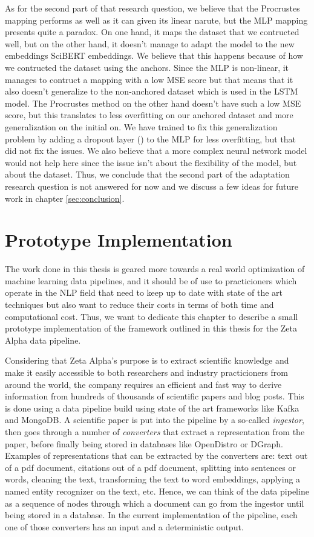 \documentclass[12pt]{extreport}
\begin{document}
As for the second part of that research question, we believe that the Procrustes mapping performs as well as it can given its linear narute, but the MLP mapping presents quite a paradox. On one hand, it maps the dataset that we contructed well, but on the other hand, it doesn't manage to adapt the model to the new embeddings SciBERT embeddings. We believe that this happens because of how we contructed the dataset using the anchors. Since the MLP is non-linear, it manages to contruct a mapping with a low MSE score but that means that it also doesn't generalize to the non-anchored dataset which is used in the LSTM model. The Procrustes method on the other hand doesn't have such a low MSE score, but this translates to less overfitting on our anchored dataset and more generalization on the initial on. We have trained to fix this generalization problem by adding a dropout layer (\cite{dropout}) to the MLP for less overfitting, but that did not fix the issues. We also believe that a more complex neural network model would not help here since the issue isn't about the flexibility of the model, but about the dataset. Thus, we conclude that the second part of the adaptation research question is not answered for now and we discuss a few ideas for future work in chapter \ref{sec:conclusion}.

\chapter{Prototype Implementation} \label{sec:prototype}

The work done in this thesis is geared more towards a real world optimization of machine learning data pipelines, and it should be of use to practicioners which operate in the NLP field that need to keep up to date with state of the art techniques but also want to reduce their costs in terms of both time and computational cost. Thus, we want to dedicate this chapter to describe a small prototype implementation of the framework outlined in this thesis for the Zeta Alpha data pipeline.

Considering that Zeta Alpha's purpose is to extract scientific knowledge and make it easily accessible to both researchers and industry practicioners from around the world, the company requires an efficient and fast way to derive information from hundreds of thousands of scientific papers and blog posts. This is done using a data pipeline build using state of the art frameworks like Kafka and MongoDB. A scientific paper is put into the pipeline by a so-called \emph{ingestor}, then goes through a number of \emph{converters} that extract a representation from the paper, before finally being stored in databases like OpenDistro or DGraph. Examples of representations that can be extracted by the converters are: text out of a pdf document, citations out of a pdf document, splitting into sentences or words, cleaning the text, transforming the text to word embeddings, applying a named entity recognizer on the text, etc. Hence, we can think of the data pipeline as a sequence of nodes through which a document can go from the ingestor until being stored in a database. In the current implementation of the pipeline, each one of those converters has an input and a deterministic output.
\end{document}
